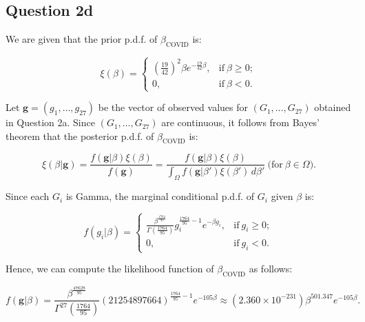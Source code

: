 \documentclass[11pt,fancychapters]{article}
\begin{document}
\subsection*{Question 2d}

We are given that the prior p.d.f. of $\beta_\text{COVID}$ is:

\begin{equation}\label{eqn2d1}
    \xi(\beta) = {\begin{cases}{\left(\frac{19}{42}\right)^2\beta e^{-\frac{19}{42} \beta},}&\mathrm{if} \ \beta \geq 0;\\[8pt]0,&\mathrm{if} \ \beta < 0.\end{cases}}
\end{equation}

Let $\boldsymbol{g} = (g_1, \dots, g_{27})$ be the vector of observed values for $(G_1, \dots, G_{27})$ obtained in Question 2a. Since $(G_1, \dots, G_{27})$ are continuous, it follows from Bayes' theorem that the posterior p.d.f. of $\beta_\text{COVID}$ is:

\begin{equation}\label{eqn2d2}
    \xi(\beta | \boldsymbol{g}) = \frac{f(\boldsymbol{g} | \beta) \xi(\beta)}{f(\boldsymbol{g})} = \frac{f(\boldsymbol{g} | \beta) \xi(\beta)}{\int_\Omega f(\boldsymbol{g} | \beta') \xi(\beta') \, d\beta'} ~ \mathrm{(for} \ \beta \in \Omega\mathrm{)}.
\end{equation}

Since each $G_i$ is Gamma, the marginal conditional p.d.f. of $G_i$ given $\beta$ is:

\begin{equation}\label{eqn2d3}
    f(g_i | \beta) = {\begin{cases}{\frac{\beta^\frac{1764}{95}}{\Gamma \left( \frac{1764}{95} \right)} g_i^{\frac{1764}{95} - 1} e^{-\beta g_i},}&\mathrm{if} \ g_i \geq 0;\\[8pt]0,&\mathrm{if} \ g_i < 0.\end{cases}}
\end{equation}

Hence, we can compute the likelihood function of $\beta_\text{COVID}$ as follows:

\begin{equation}\label{eqn2d4}
    f(\boldsymbol{g} | \beta) = \frac{\beta^{\frac{47628}{95}}}{\Gamma^{27} \left( \frac{1764}{95} \right)} \left( 21254897664 \right)^{\frac{1764}{95} - 1} e^{-105 \beta} \approx (2.360 \times 10^{-231}) \beta^{501.347} e^{-105 \beta}.
\end{equation}
\end{document}
